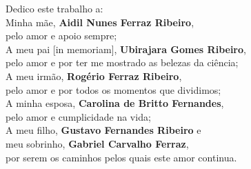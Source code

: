 
\begin{dedicatoria}

\vspace*{\fill}

\begin{flushright}
Dedico este trabalho a:\\[10pt]

Minha mãe, \textbf{Aidil Nunes Ferraz Ribeiro},\\
pelo amor e apoio sempre;\\
A meu pai [in memoriam], \textbf{Ubirajara Gomes Ribeiro},\\
pelo amor e por ter me mostrado as belezas da ciência;\\
A meu irmão, \textbf{Rogério Ferraz Ribeiro},\\
pelo amor e por todos os momentos que dividimos;\\
A minha esposa, \textbf{Carolina de Britto Fernandes},\\
pelo amor e cumplicidade na vida;\\
A meu filho, \textbf{Gustavo Fernandes Ribeiro} e\\
meu sobrinho, \textbf{Gabriel Carvalho Ferraz},\\
por serem os caminhos pelos quais este amor continua.
\end{flushright}
\end{dedicatoria}
